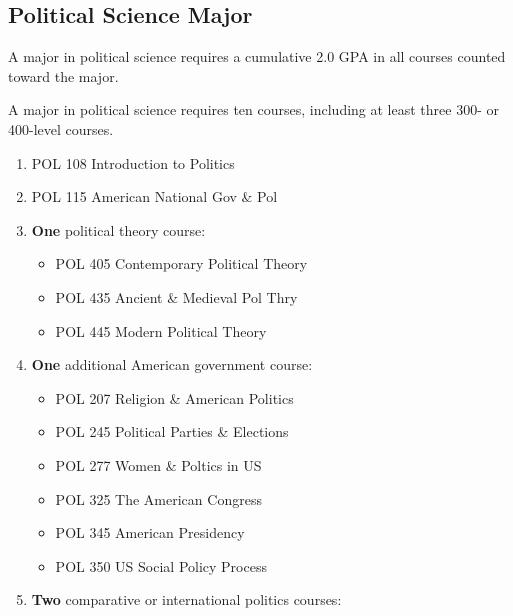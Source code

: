\documentclass[
  letterpaper,
]{scrbook}
\providecommand{\tightlist}{%
  \setlength{\itemsep}{0pt}\setlength{\parskip}{0pt}}
\begin{document}
\subsection{Political Science Major}\label{political-science-major}

A major in political science requires a cumulative 2.0 GPA in all
courses counted toward the major.

A major in political science requires ten courses, including at least
three 300- or 400-level courses.

\begin{enumerate}
\def\labelenumi{\arabic{enumi}.}
\item
  POL 108 Introduction to Politics
\item
  POL 115 American National Gov \& Pol
\item
  \textbf{One} political theory course:

  \begin{itemize}
  \tightlist
  \item
    POL 405 Contemporary Political Theory
  \item
    POL 435 Ancient \& Medieval Pol Thry
  \item
    POL 445 Modern Political Theory
  \end{itemize}
\item
  \textbf{One} additional American government course:

  \begin{itemize}
  \tightlist
  \item
    POL 207 Religion \& American Politics
  \item
    POL 245 Political Parties \& Elections
  \item
    POL 277 Women \& Poltics in US
  \item
    POL 325 The American Congress
  \item
    POL 345 American Presidency
  \item
    POL 350 US Social Policy Process
  \end{itemize}
\item
  \textbf{Two} comparative or international politics courses:


\end{enumerate}
\end{document}
